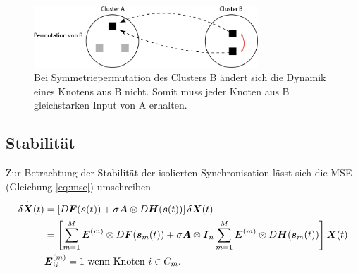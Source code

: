 	\begin{figure}
		\includegraphics[width=0.75\textwidth]{abb/misc/perm_b.png}
		\caption{Bei Symmetriepermutation des Clusters B ändert sich die Dynamik eines Knotens aus B nicht. Somit muss jeder Knoten aus B gleichstarken Input von A erhalten.}
		\label{fig:permb}
	\end{figure}
	

\subsection*{Stabilität}
Zur Betrachtung der Stabilität der isolierten Synchronisation lässt sich die MSE (Gleichung \ref{eq:mse}) umschreiben
\begin{align}
	\label{eq:clustermse}
	\delta\overset{\cdot}{\boldsymbol{X}}(t)&=	
	\left[D\boldsymbol{F}(\boldsymbol{s}(t))+\sigma\boldsymbol{A}\otimes D\boldsymbol{H}(\boldsymbol{s}(t))\right]\delta\boldsymbol{X}(t)\\&=
	\left[\sum_{m=1}^{M} \boldsymbol{E}^{(m)} \otimes D\boldsymbol{F}(\boldsymbol{s}_m(t))+\sigma\boldsymbol{A}\otimes \boldsymbol{I}_n\sum_{m=1}^{M} 			\boldsymbol{E}^{(m)}\otimes D\boldsymbol{H}(\boldsymbol{s}_m(t))\right]\boldsymbol{X}(t)
	\\\notag & \boldsymbol{E}^{(m)}_{ii} =1\text{ wenn Knoten }i \in C_m.
	\end{align}
	
